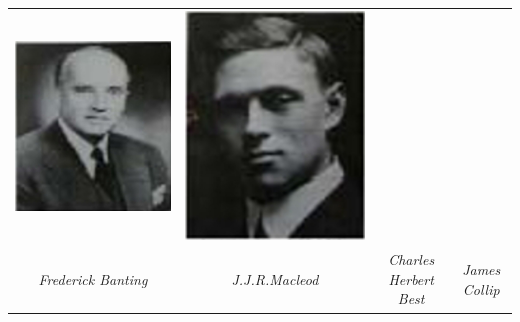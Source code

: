 {{\begin{tabular}{@{}cccc@{}}
\includegraphics[scale=.6]{images/013.jpg} &
\includegraphics[scale=.5]{images/014.jpg}\\
{\small\textit{Frederick Banting}} &
{\small\textit{J.J.R.Macleod}} &
{\small\textit{Charles Herbert Best}} &
{\small\textit{James Collip}}
\end{tabular}
}}

